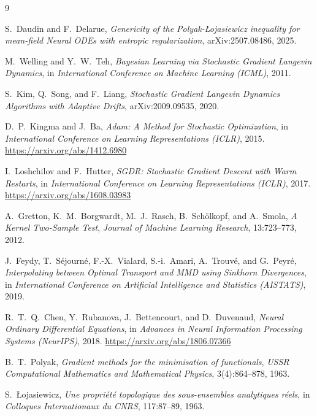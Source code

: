 \documentclass[11pt, a4paper]{article}
\theoremstyle{definition}
\begin{document}
\begin{thebibliography}{9}

  S.~Daudin and F.~Delarue,
  \textit{Genericity of the Polyak-{\L}ojasiewicz inequality for mean-field
  Neural ODEs with entropic regularization},
  arXiv:2507.08486, 2025.

  M.~Welling and Y.~W.~Teh,
  \textit{Bayesian Learning via Stochastic Gradient Langevin Dynamics},
  in \textit{International Conference on Machine Learning (ICML)}, 2011.

  S.~Kim, Q.~Song, and F.~Liang,
  \textit{Stochastic Gradient Langevin Dynamics Algorithms with Adaptive Drifts},
  arXiv:2009.09535, 2020.

  D.~P.~Kingma and J.~Ba,
  \textit{Adam: A Method for Stochastic Optimization},
  in \textit{International Conference on Learning Representations (ICLR)},
  2015.
  \url{https://arxiv.org/abs/1412.6980}

  I.~Loshchilov and F.~Hutter,
  \textit{SGDR: Stochastic Gradient Descent with Warm Restarts},
  in \textit{International Conference on Learning Representations (ICLR)},
  2017.
  \url{https://arxiv.org/abs/1608.03983}

  A.~Gretton, K.~M.~Borgwardt, M.~J.~Rasch, B.~Schölkopf, and A.~Smola,
  \textit{A Kernel Two-Sample Test},
  \textit{Journal of Machine Learning Research}, 13:723--773, 2012.

  J.~Feydy, T.~Séjourné, F.-X.~Vialard, S.-i.~Amari, A.~Trouvé, and G.~Peyré,
  \textit{Interpolating between Optimal Transport and MMD using Sinkhorn Divergences},
  in \textit{International Conference on Artificial Intelligence and Statistics
  (AISTATS)}, 2019.

  R.~T.~Q.~Chen, Y.~Rubanova, J.~Bettencourt, and D.~Duvenaud,
  \textit{Neural Ordinary Differential Equations},
  in \textit{Advances in Neural Information Processing Systems (NeurIPS)},
  2018.
  \url{https://arxiv.org/abs/1806.07366}

  B.~T.~Polyak,
  \textit{Gradient methods for the minimisation of functionals},
  \textit{USSR Computational Mathematics and Mathematical Physics},
  3(4):864--878, 1963.

  S.~Łojasiewicz,
  \textit{Une propriété topologique des sous-ensembles analytiques réels},
  in \textit{Colloques Internationaux du CNRS}, 117:87--89, 1963.

\end{thebibliography}
\end{document}
